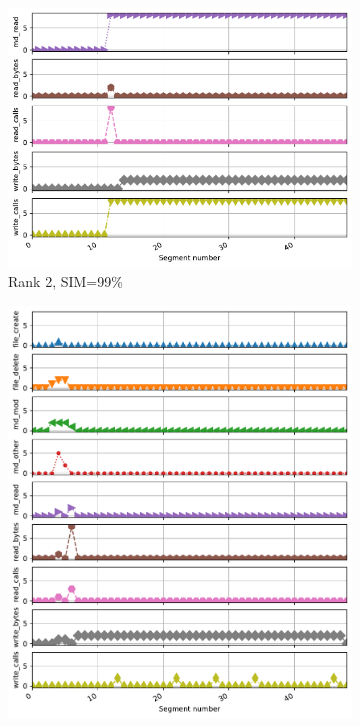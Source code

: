 \documentclass{jhps}
\begin{document}
\begin{figure}[bt]
\begin{subfigure}{0.3\textwidth}
\centering
\vspace*{-1.6cm}
\includegraphics[width=\textwidth]{job_similarities_5024292-out/hex_native-0.9878--1timeseries5240733}
\caption{Rank 2, SIM=99\%}
\end{subfigure}
\begin{subfigure}{0.3\textwidth}
\includegraphics[width=\textwidth]{job_similarities_5024292-out/hex_native-0.9084--14timeseries8037817}

\end{subfigure}
\end{figure}
\end{document}
